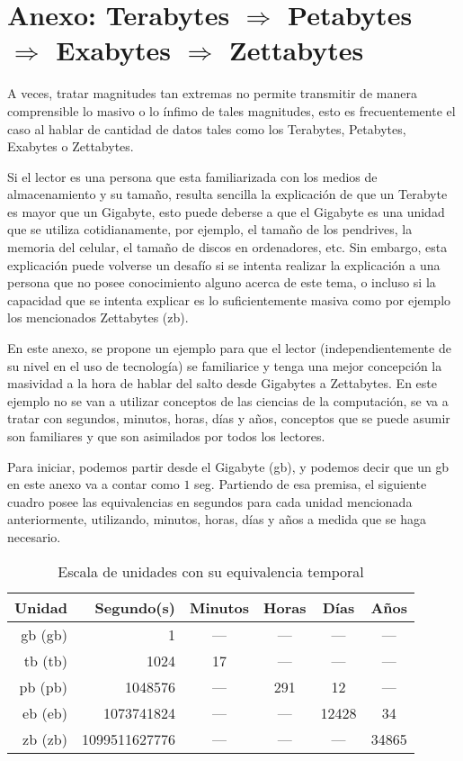 \clearpage
\section*{Anexo: Terabytes $\Rightarrow$ Petabytes $\Rightarrow$ Exabytes $\Rightarrow$ Zettabytes}
\label{sec:petabytes_a_zettabytes}

A veces, tratar magnitudes tan extremas no permite transmitir de manera
comprensible lo masivo o lo ínfimo de tales magnitudes,
esto es frecuentemente el caso al hablar de cantidad de
datos tales como los Terabytes, Petabytes, Exabytes o Zettabytes.

Si el lector es una persona que esta familiarizada con los medios de almacenamiento
y su tamaño, resulta sencilla la explicación de que un Terabyte es mayor que
un Gigabyte, esto puede deberse a que el Gigabyte es una unidad que se utiliza
cotidianamente, por ejemplo, el tamaño de los pendrives, la memoria del celular,
el tamaño de discos en ordenadores, etc. Sin embargo, esta explicación puede
volverse un desafío si se intenta realizar la explicación a una persona que no
posee conocimiento alguno acerca de este tema, o incluso si la capacidad que se
intenta explicar es lo suficientemente masiva como por ejemplo los mencionados
Zettabytes (\acrshort{zb}).

En este anexo, se propone un ejemplo para que el lector (independientemente de
su nivel en el uso de tecnología) se familiarice y tenga una mejor
concepción la masividad a la hora de hablar del salto desde Gigabytes a
Zettabytes. En este ejemplo no se van a utilizar
conceptos de las ciencias de la computación, se va a tratar 
con segundos, minutos, horas, días y años, conceptos que se puede asumir son
familiares y que son asimilados por todos los lectores.

Para iniciar, podemos partir desde el Gigabyte (\acrshort{gb}), y podemos decir
que un \acrshort{gb} en este anexo va a contar como $1$ seg. Partiendo de esa
premisa, el siguiente cuadro posee las equivalencias en segundos para cada unidad
mencionada anteriormente, utilizando, minutos, horas, días y años a medida que
se haga necesario.

\begin{table}[h]
  \centering
  \begin{tabular}{||r r c c c c||} 
   \hline
    Unidad & Segundo(s) & Minutos & Horas & Días & Años \\ [0.5ex] 
   \hline\hline
   \acrlong{gb} (\acrshort{gb}) & 1 & --- & --- & --- & --- \\ 
   \hline
   \acrlong{tb} (\acrshort{tb}) & 1024 & 17 & --- & --- & --- \\
   \hline
   \acrlong{pb} (\acrshort{pb}) & 1048576 & --- & 291 & 12 & --- \\
   \hline
   \acrlong{eb} (\acrshort{eb}) & 1073741824 & --- & --- & 12428 & 34 \\
   \hline
   \acrlong{zb} (\acrshort{zb}) & 1099511627776 & --- & --- & --- & 34865 \\ [1ex] 
   \hline
  \end{tabular}
  \\
  \label{unidades:gb_a_zb}
  \caption{Escala de unidades con su equivalencia temporal}
\end{table}

